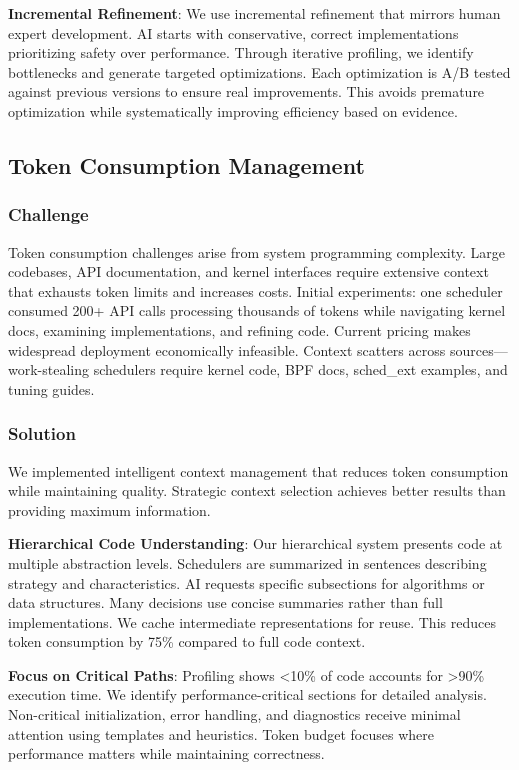 \textbf{Incremental Refinement}: We use incremental refinement that mirrors human expert development. AI starts with conservative, correct implementations prioritizing safety over performance. Through iterative profiling, we identify bottlenecks and generate targeted optimizations. Each optimization is A/B tested against previous versions to ensure real improvements. This avoids premature optimization while systematically improving efficiency based on evidence.

\subsection{Token Consumption Management}

\subsubsection{Challenge}
Token consumption challenges arise from system programming complexity. Large codebases, API documentation, and kernel interfaces require extensive context that exhausts token limits and increases costs. Initial experiments: one scheduler consumed 200+ API calls processing thousands of tokens while navigating kernel docs, examining implementations, and refining code. Current pricing makes widespread deployment economically infeasible. Context scatters across sources—work-stealing schedulers require kernel code, BPF docs, sched\_ext examples, and tuning guides.

\subsubsection{Solution}
We implemented intelligent context management that reduces token consumption while maintaining quality. Strategic context selection achieves better results than providing maximum information.

\textbf{Hierarchical Code Understanding}: Our hierarchical system presents code at multiple abstraction levels. Schedulers are summarized in sentences describing strategy and characteristics. AI requests specific subsections for algorithms or data structures. Many decisions use concise summaries rather than full implementations. We cache intermediate representations for reuse. This reduces token consumption by 75\% compared to full code context.

\textbf{Focus on Critical Paths}: Profiling shows <10\% of code accounts for >90\% execution time. We identify performance-critical sections for detailed analysis. Non-critical initialization, error handling, and diagnostics receive minimal attention using templates and heuristics. Token budget focuses where performance matters while maintaining correctness.

